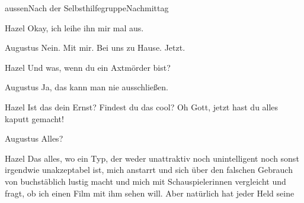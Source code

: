 \documentclass[12pt]{article}
\begin{document}
\begin{scene}[cut to]{aussen}{Nach der Selbsthilfegruppe}{Nachmittag}
        \begin{dialog}{Hazel}
            Okay, ich leihe ihn mir mal aus.
        \end{dialog}

        \begin{dialog}{Augustus}
            Nein.
            Mit mir.
            Bei uns zu Hause.
            Jetzt.
        \end{dialog}

        \begin{dialog}{Hazel}
            Und was, wenn du ein Axtmörder bist?
        \end{dialog}

        \begin{dialog}{Augustus}
            Ja, das kann man nie ausschließen.
        \end{dialog}


        \begin{dialog}[entsetzt]{Hazel}
            Ist das dein Ernst?
            Findest du das cool?
            Oh Gott, jetzt hast du alles kaputt gemacht!
        \end{dialog}

        \begin{dialog}{Augustus}
            Alles?
        \end{dialog}

        \begin{dialog}{Hazel}
            Das alles, wo ein Typ, der weder unattraktiv noch unintelligent noch sonst irgendwie unakzeptabel ist, mich anstarrt und sich über den falschen Gebrauch von buchstäblich lustig macht und mich mit Schauspielerinnen vergleicht und fragt, ob ich einen Film mit ihm sehen will.
            Aber natürlich hat jeder Held seine
        \end{dialog}
    \end{scene}
\end{document}

